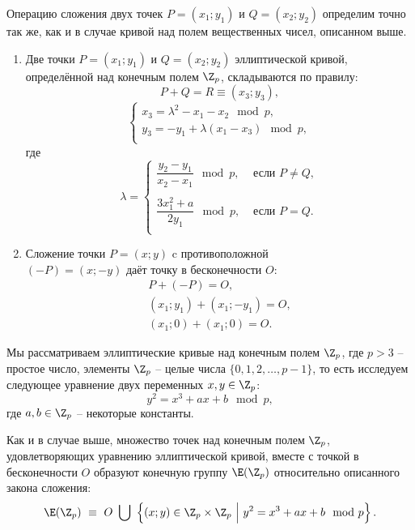 Операцию сложения двух точек $P = (x_1; y_1)$ и $Q = (x_2; y_2)$ определим точно так же, как и в случае кривой над полем вещественных чисел, описанном выше.

\begin{enumerate}
    \item Две точки $P = (x_1; y_1)$ и $Q = (x_2; y_2)$ эллиптической кривой, определённой над конечным полем $\Z_p$, складываются по правилу:
        \[
            P + Q = R \equiv (x_3; y_3),
        \] \[
            \begin{cases}
                x_3 = \lambda^2 - x_1 - x_2 \mod p,\\
                y_3 = - y_1 + \lambda (x_1 - x_3) \mod p,\\
            \end{cases}
        \]
        где
        \[
            \lambda = \begin{cases}
                \dfrac{y_2 - y_1}{x_2 - x_1} \mod p, & \text{ если } P \ne Q, \\
                \\
                \dfrac{3 x_1^2 + a}{2 y_1} \mod p, & \text{ если } P = Q. \\
            \end{cases}
        \]
    \item Сложение точки $P=(x; y)$ c противоположной \\
        $(-P) = (x; -y)$ даёт точку в бесконечности $O$:
        \begin{gather*}
          P + (-P) = O, \\
         (x_1; y_1) + (x_1; -y_1) = O, \\
         (x_1; 0) + (x_1; 0) = O. 
        \end{gather*}
\end{enumerate}

Мы рассматриваем эллиптические кривые над конечным полем $\Z_p$, где $p > 3$ -- простое число, элементы $\Z_p$ -- целые числа $\{0, 1, 2, \ldots, p-1\}$, то есть исследуем следующее уравнение двух переменных $x, y \in \Z_p$:
    \[ y^2 = x^3 + a x + b \mod p, \]
где $a, b \in \Z_p$ -- некоторые константы.

Как и в случае выше, множество точек над конечным полем $\Z_p$, удовлетворяющих уравнению эллиптической кривой, вместе с точкой в бесконечности $O$ образуют конечную группу $\E(\Z_p)$ относительно описанного закона сложения:
    \[ \E(\Z_p) ~ \equiv~  O ~ \bigcup ~
        \left\{ (x; y) \in \Z_p \times \Z_p ~\Big|~ y^2 = x^3 + a x + b \mod p \right\}. \]

